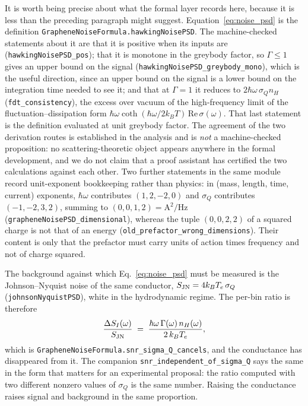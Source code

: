 \documentclass[aps,prd,reprint,nofootinbib,superscriptaddress]{revtex4-2}
\begin{document}
It is worth being precise about what the formal layer records here,
because it is less than the preceding paragraph might suggest.
Equation~\eqref{eq:noise_psd} is the definition
\texttt{GrapheneNoiseFormula.hawkingNoisePSD}. The machine-checked
statements about it are that it is positive when its inputs are
(\texttt{hawkingNoisePSD\_pos}); that it is monotone in the greybody
factor, so $\Gamma \leq 1$ gives an upper bound on the signal
(\texttt{hawkingNoisePSD\_greybody\_mono}), which is the useful
direction, since an upper bound on the signal is a lower bound on the
integration time needed to see it; and that at $\Gamma = 1$ it reduces to
$2\hbar\omega\,\sigma_Q n_H$ (\texttt{fdt\_consistency}), the excess over
vacuum of the high-frequency limit of the fluctuation--dissipation form
$\hbar\omega \coth(\hbar\omega/2k_BT)\,\mathrm{Re}\,\sigma(\omega)$. That
last statement is the definition evaluated at unit greybody factor. The
agreement of the two derivation routes is established in the analysis and
is \emph{not} a machine-checked proposition: no scattering-theoretic
object appears anywhere in the formal development, and we do not claim
that a proof assistant has certified the two calculations against each
other. Two further statements in the same module record unit-exponent
bookkeeping rather than physics: in (mass, length, time, current)
exponents, $\hbar\omega$ contributes $(1,2,-2,0)$ and $\sigma_Q$
contributes $(-1,-2,3,2)$, summing to
$(0,0,1,2) = \mathrm{A}^2/\mathrm{Hz}$
(\texttt{grapheneNoisePSD\_dimensional}), whereas the tuple $(0,0,2,2)$
of a squared charge is not that of an energy
(\texttt{old\_prefactor\_wrong\_dimensions}). Their content is only that
the prefactor must carry units of action times frequency and not of
charge squared.

The background against which Eq.~\eqref{eq:noise_psd} must be measured is
the Johnson--Nyquist noise of the same conductor,
$S_{\rm JN} = 4 k_B T_e \,\sigma_Q$ (\texttt{johnsonNyquistPSD}), white
in the hydrodynamic regime. The per-bin ratio is therefore
\begin{equation}
\frac{\Delta S_I(\omega)}{S_{\rm JN}}
\;=\;
\frac{\hbar\omega\,\Gamma(\omega)\,n_H(\omega)}{2\,k_B T_e},
\label{eq:snr_bin}
\end{equation}
which is \texttt{GrapheneNoiseFormula.snr\_sigma\_Q\_cancels}, and the
conductance has disappeared from it. The companion
\texttt{snr\_independent\_of\_sigma\_Q} says the same in the form that
matters for an experimental proposal: the ratio computed with two
different nonzero values of $\sigma_Q$ is the same number. Raising the
conductance raises signal and background in the same proportion.
\end{document}
